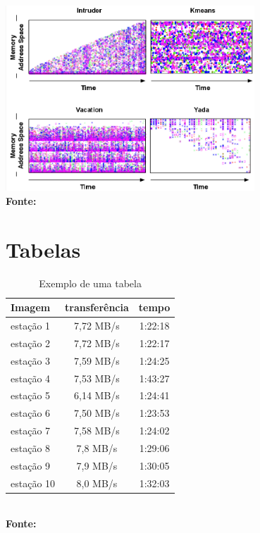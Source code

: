\begin{grafico}
	\centering	
	\includegraphics[width=0.7\textwidth]{figuras/access.png}
	\\\textbf{\footnotesize Fonte: }
	\label{gra:grafico1}
\end{grafico}


 \section{\esp Tabelas}

\begin{table}[htb]
	\centering
	\caption{\hspace{0.1cm} Exemplo de uma tabela}
	\vspace{-0.3cm} %
	\label{tab:tabela1}
	\begin{tabular}{l|c|c}
  \hline
    \textbf{Imagem}	& \textbf{transferência} & \textbf{tempo} \\
    \hline
     estação 1	& 7,72 MB/s &  1:22:18 \\
     estação 2	& 7,72 MB/s &  1:22:17 \\
     estação 3	& 7,59 MB/s & 1:24:25 \\
     estação 4  & 7,53 MB/s & 1:43:27 \\
     estação 5	& 6,14 MB/s  &  1:24:41 \\
     estação 6  &  7,50 MB/s & 1:23:53 \\
     estação 7  & 7,58 MB/s  &  1:24:02 \\
     estação 8  & 7,8 MB/s  &  1:29:06 \\
     estação 9  & 7,9 MB/s  &  1:30:05 \\
     estação 10 & 8,0 MB/s  &  1:32:03 \\
     \hline
 \end{tabular}
	\small
	{\footnotesize\\ \textbf{Fonte: }}
\end{table}


